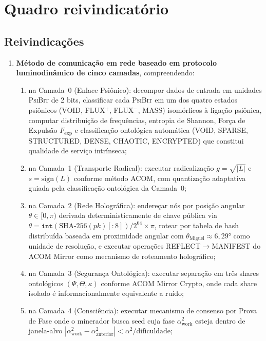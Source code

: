 \documentclass[12pt,a4paper]{article}
\newcommand{\alphaii}{\alpha^2}
\newcommand{\Fexp}{F_{\text{exp}}}
\newcommand{\thetaM}{\theta_{\text{Miguel}}}
\newcommand{\PsiBit}{\textsc{PsiBit}}
\begin{document}
\newpage
\section{Quadro reivindicatório}

\subsection*{Reivindicações}

\begin{enumerate}

\item \textbf{Método de comunicação em rede baseado em protocolo
luminodinâmico de cinco camadas}, compreendendo:
  \begin{enumerate}[label=(\alph*)]
  \item na Camada~0 (Enlace Psiônico): decompor dados de
  entrada em unidades \PsiBit{} de 2 bits, classificar cada
  \PsiBit{} em um dos quatro estados psiônicos (VOID, FLUX$^+$,
  FLUX$^-$, MASS) isomórficos à ligação psiônica, computar
  distribuição de frequências, entropia de Shannon, Força de
  Expulsão $\Fexp$ e classificação ontológica automática
  (VOID, SPARSE, STRUCTURED, DENSE, CHAOTIC, ENCRYPTED) que
  constitui qualidade de serviço intrínseca;
  \item na Camada~1 (Transporte Radical): executar radicalização
  $g = \sqrt{|L|}$ e $s = \text{sign}(L)$ conforme método ACOM,
  com quantização adaptativa guiada pela classificação
  ontológica da Camada~0;
  \item na Camada~2 (Rede Holográfica): endereçar nós por
  posição angular $\theta \in [0, \pi)$ derivada
  deterministicamente de chave pública via
  $\theta = \texttt{int}(\text{SHA-256}(pk)[:8]) / 2^{64} \times
  \pi$, rotear por tabela de hash distribuída baseada em
  proximidade angular com $\thetaM \approx 6{,}29°$ como
  unidade de resolução, e executar operações
  REFLECT$\to$MANIFEST do ACOM Mirror como mecanismo de
  roteamento holográfico;
  \item na Camada~3 (Segurança Ontológica): executar separação
  em três shares ontológicos $(\Psi, \Theta, \kappa)$ conforme
  ACOM Mirror Crypto, onde cada share isolado é
  informacionalmente equivalente a ruído;
  \item na Camada~4 (Consciência): executar mecanismo de
  consenso por Prova de Fase onde o minerador busca seed cuja
  fase $\alphaii_{\text{work}}$ esteja dentro de janela-alvo
  $|\alphaii_{\text{work}} - \alphaii_{\text{anterior}}| <
  \alphaii / \text{dificuldade}$;


\end{enumerate}
\end{enumerate}
\end{document}
